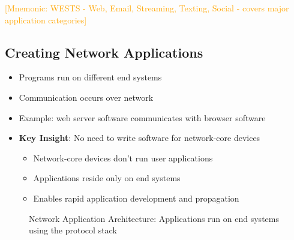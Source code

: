 \documentclass[12pt]{article}
\begin{document}
\textcolor{orange}{[Mnemonic: WESTS - Web, Email, Streaming, Texting, Social - covers major application categories]}

\subsection{Creating Network Applications}
\begin{itemize}
    \item Programs run on different end systems
    \item Communication occurs over network
    \item Example: web server software communicates with browser software
    \item \textbf{Key Insight}: No need to write software for network-core devices
          \begin{itemize}
              \item Network-core devices don't run user applications
              \item Applications reside only on end systems
              \item Enables rapid application development and propagation
          \end{itemize}
\end{itemize}

\begin{figure}[h]
    \centering
    \caption{Network Application Architecture: Applications run on end systems using the protocol stack}
    \label{fig:network-arch}
\end{figure}
\end{document}
